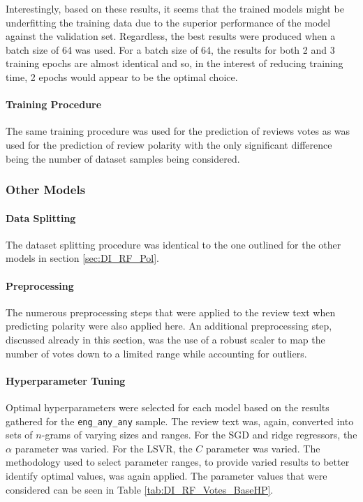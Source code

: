 Interestingly, based on these results, it seems that the trained models might be underfitting the training data due to the superior performance of the model against the validation set. Regardless, the best results were produced when a batch size of 64 was used. For a batch size of 64, the results for both 2 and 3 training epochs are almost identical and so, in the interest of reducing training time, 2 epochs would appear to be the optimal choice.

\paragraph{Training Procedure}

The same training procedure was used for the prediction of reviews votes as was used for the prediction of review polarity with the only significant difference being the number of dataset samples being considered.

\subsubsection{Other Models}

\paragraph{Data Splitting}

The dataset splitting procedure was identical to the one outlined for the other models in section \ref{sec:DI_RF_Pol}.

\paragraph{Preprocessing}

The numerous preprocessing steps that were applied to the review text when predicting polarity were also applied here. An additional preprocessing step, discussed already in this section, was the use of a robust scaler to map the number of votes down to a limited range while accounting for outliers.

\paragraph{Hyperparameter Tuning}

Optimal hyperparameters were selected for each model based on the results gathered for the \texttt{eng\_any\_any} sample. The review text was, again, converted into sets of $n$-grams of varying sizes and ranges. For the SGD and ridge regressors, the $\alpha$ parameter was varied. For the LSVR, the $C$ parameter was varied. The methodology used to select parameter ranges, to provide varied results to better identify optimal values, was again applied. The parameter values that were considered can be seen in Table \ref{tab:DI_RF_Votes_BaseHP}.

